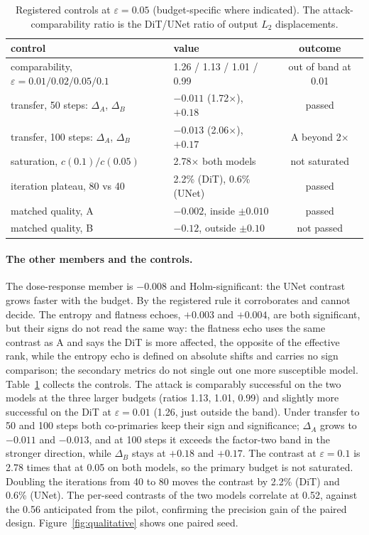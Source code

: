 \documentclass{article}
\begin{document}
\begin{table}[t]
  \caption{Registered controls at $\varepsilon{=}0.05$ (budget-specific where indicated). The attack-comparability ratio is the DiT/UNet ratio of output $L_2$ displacements.}
  \label{tab:controls}
  \centering
  \begin{small}
    \begin{tabular}{llc}
      \toprule
      control & value & outcome \\
      \midrule
      comparability, $\varepsilon{=}0.01/0.02/0.05/0.1$ & 1.26 / 1.13 / 1.01 / 0.99 & out of band at 0.01 \\
      transfer, 50 steps: $\Delta_A$, $\Delta_B$ & $-0.011$ (1.72$\times$), $+0.18$ & passed \\
      transfer, 100 steps: $\Delta_A$, $\Delta_B$ & $-0.013$ (2.06$\times$), $+0.17$ & A beyond 2$\times$ \\
      saturation, $c(0.1)/c(0.05)$ & 2.78$\times$ both models & not saturated \\
      iteration plateau, 80 vs 40 & 2.2\% (DiT), 0.6\% (UNet) & passed \\
      matched quality, A & $-0.002$, inside $\pm 0.010$ & passed \\
      matched quality, B & $-0.12$, outside $\pm 0.10$ & not passed \\
      \bottomrule
    \end{tabular}
  \end{small}
  \vspace{-0.3cm}
\end{table}

\paragraph{The other members and the controls.} The dose-response member is $-0.008$ and Holm-significant: the UNet contrast grows faster with the budget. By the registered rule it corroborates and cannot decide. The entropy and flatness echoes, $+0.003$ and $+0.004$, are both significant, but their signs do not read the same way: the flatness echo uses the same contrast as A and says the DiT is more affected, the opposite of the effective rank, while the entropy echo is defined on absolute shifts and carries no sign comparison; the secondary metrics do not single out one more susceptible model. Table~\ref{tab:controls} collects the controls. The attack is comparably successful on the two models at the three larger budgets (ratios 1.13, 1.01, 0.99) and slightly more successful on the DiT at $\varepsilon{=}0.01$ (1.26, just outside the band). Under transfer to 50 and 100 steps both co-primaries keep their sign and significance; $\Delta_A$ grows to $-0.011$ and $-0.013$, and at 100 steps it exceeds the factor-two band in the stronger direction, while $\Delta_B$ stays at $+0.18$ and $+0.17$. The contrast at $\varepsilon{=}0.1$ is 2.78 times that at 0.05 on both models, so the primary budget is not saturated. Doubling the iterations from 40 to 80 moves the contrast by 2.2\% (DiT) and 0.6\% (UNet). The per-seed contrasts of the two models correlate at 0.52, against the 0.56 anticipated from the pilot, confirming the precision gain of the paired design. Figure~\ref{fig:qualitative} shows one paired seed.
\end{document}
